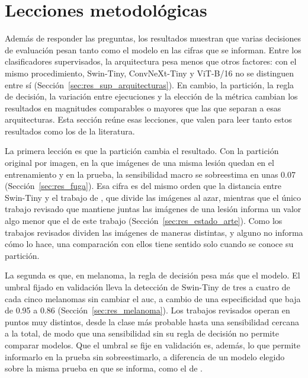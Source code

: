 \section{Lecciones metodológicas}
\label{sec:disc_lecciones}

Además de responder las preguntas, los resultados muestran que varias decisiones de evaluación pesan tanto como el
modelo en las cifras que se informan. Entre los clasificadores supervisados, la arquitectura pesa menos que otros
factores: con el mismo procedimiento, Swin-Tiny, ConvNeXt-Tiny y ViT-B/16 no se distinguen entre sí
(Sección~\ref{sec:res_sup_arquitecturas}). En cambio, la partición, la regla de decisión, la variación entre
ejecuciones y la elección de la métrica cambian los resultados en magnitudes comparables o mayores que las que separan
a esas arquitecturas. Esta sección reúne esas lecciones, que valen para leer tanto estos resultados como los de la
literatura.

La primera lección es que la partición cambia el resultado. Con la partición original por imagen, en la que imágenes
de una misma lesión quedan en el entrenamiento y en la prueba, la sensibilidad macro se sobreestima en unas 0.07
(Sección~\ref{sec:res_fuga}). Esa cifra es del mismo orden que la distancia entre Swin-Tiny y el trabajo de
\textcite{kim2025skinsavvy2}, que divide las imágenes al azar, mientras que el único trabajo revisado que mantiene
juntas las imágenes de una lesión informa un valor algo menor que el de este trabajo
(Sección~\ref{sec:res_estado_arte}). Como los trabajos revisados dividen las imágenes de maneras distintas, y alguno
no informa cómo lo hace, una comparación con ellos tiene sentido solo cuando se conoce su partición.

La segunda es que, en melanoma, la regla de decisión pesa más que el modelo. El umbral fijado en validación lleva la
detección de Swin-Tiny de tres a cuatro de cada cinco melanomas sin cambiar el \gls{auc}, a cambio de una
especificidad que baja de 0.95 a 0.86 (Sección~\ref{sec:res_melanoma}). Los trabajos revisados operan en puntos muy
distintos, desde la clase más probable hasta una sensibilidad cercana a la total, de modo que una sensibilidad sin su
regla de decisión no permite comparar modelos. Que el umbral se fije en validación es, además, lo que permite
informarlo en la prueba sin sobreestimarlo, a diferencia de un modelo elegido sobre la misma prueba en que se
informa, como el de \textcite{yao2022single}.

